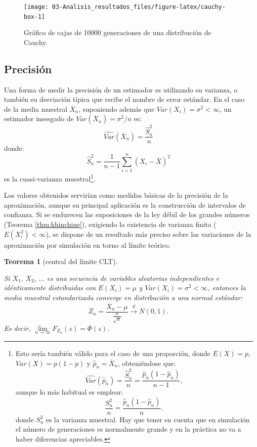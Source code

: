 \documentclass[
  10pt,
]{book}
\theoremstyle{break}
\newtheorem{theorem}{Teorema}[chapter]
\theoremstyle{nonumberplain}
\let\oldfootnote\footnote
\renewcommand\footnote[1]{\oldfootnote{\hspace{2mm}#1}}
\begin{document}
\begin{figure}[!htbp]

{\centering \texttt{[image: 03-Analisis\_resultados\_files/figure-latex/cauchy-box-1]} 

}

\caption{Gráfico de cajas de 10000 generaciones de una distribución de Cauchy.}\label{fig:cauchy-box}
\end{figure}

\hypertarget{precisiuxf3n}{%
\subsection{Precisión}\label{precisiuxf3n}}

Una forma de medir la precisión de un estimador es utilizando su varianza, o también su desviación típica que recibe el nombre de error estándar.
En el caso de la media muestral \(\overline{X}_{n}\), suponiendo además que \(Var\left( X_{i}\right) = \sigma^{2}<\infty\), un estimador
insesgado de \(Var\left( \overline{X}_{n}\right) =\sigma ^{2}/n\) es:
\[\widehat{Var}\left( \overline{X}_{n}\right) = \frac{\widehat{S}_n^{2}}{n}\]
donde:
\[\widehat{S}_{n}^{2}=\dfrac{1}{n-1}\sum\limits_{i=1}^{n}\left( X_{i}-
\overline{X}\right) ^{2}\]
es la cuasi-varianza muestral\footnote{Esto sería también válido para el caso de una proporción, donde \(E(X) = p\), \(Var(X) = p(1-p)\) y \(\hat{p}_{n} = \overline{X}_{n}\), obteniéndose que: \[\widehat{Var}\left( \hat{p}_{n}\right) = \frac{\widehat{S}_n^{2}}{n} = \frac{\hat{p}_{n}(1-\hat{p}_{n})}{n-1},\] aunque lo más habitual es emplear: \[\frac{S_n^{2}}{n} = \frac{\hat{p}_{n}(1-\hat{p}_{n})}{n},\]
  donde \(S_n^{2}\) es la varianza muestral. Hay que tener en cuenta que en simulación el número de generaciones es normalmente grande y en la práctica no va a haber diferencias apreciables.}.

Los valores obtenidos servirían como medidas básicas de la precisión de la aproximación, aunque su principal aplicación es la construcción de intervalos de confianza.
Si se endurecen las suposiciones de la ley débil de los grandes números (Teorema \ref{thm:khinchine}), exigiendo la existencia de varianza finita (\(E\left( X_{i}^2 \right) < \infty\)), se dispone de un resultado más preciso sobre las variaciones de la aproximación por simulación en torno al límite teórico.

\begin{theorem}[central del límite CLT]
\protect\hypertarget{thm:tcl}{}\label{thm:tcl}

Si \(X_{1}\), \(X_{2}\), \(\ldots\) es una secuencia de variables aleatorias independientes e idénticamente distribuidas con \(E\left( X_{i}\right) =\mu\) y
\(Var\left( X_{i}\right) = \sigma ^{2}<\infty\), entonces la media muestral estandarizada converge en distribución a una normal estándar:
\[Z_{n}=\frac{\overline{X}_{n}-\mu }{\frac{\sigma }{\sqrt{n}}}
\overset{d}{ \longrightarrow } N(0,1).\]
Es decir, \(\lim\limits_{n\rightarrow \infty }F_{Z_{n}}(z)=\Phi (z)\).
\end{theorem}
\end{document}
